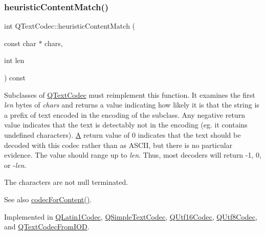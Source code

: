 \subsubsection{\texorpdfstring{heuristicContentMatch()}{heuristicContentMatch()}}
{\footnotesize\ttfamily int Q\+Text\+Codec\+::heuristic\+Content\+Match (\begin{DoxyParamCaption}\item[{const char $\ast$}]{chars,  }\item[{int}]{len }\end{DoxyParamCaption}) const\hspace{0.3cm}{\ttfamily [pure virtual]}}

Subclasses of \mbox{\hyperlink{class_q_text_codec}{Q\+Text\+Codec}} must reimplement this function. It examines the first {\itshape len} bytes of {\itshape chars} and returns a value indicating how likely it is that the string is a prefix of text encoded in the encoding of the subclass. Any negative return value indicates that the text is detectably not in the encoding (eg. it contains undefined characters). \mbox{\hyperlink{class_a}{A}} return value of 0 indicates that the text should be decoded with this codec rather than as A\+S\+C\+II, but there is no particular evidence. The value should range up to {\itshape len}. Thus, most decoders will return -\/1, 0, or -\/{\itshape len}.

The characters are not null terminated.

\begin{DoxySeeAlso}{See also}
\mbox{\hyperlink{class_q_text_codec_aeb3ec365c6c4f1812689a2b66ed09e27}{codec\+For\+Content()}}. 
\end{DoxySeeAlso}


Implemented in \mbox{\hyperlink{class_q_latin1_codec_a6d2af26fea72aee95f3f07049deeb72c}{Q\+Latin1\+Codec}}, \mbox{\hyperlink{class_q_simple_text_codec_a77599a0baeceb12a42dadcbeb9b03994}{Q\+Simple\+Text\+Codec}}, \mbox{\hyperlink{class_q_utf16_codec_af33db3e4543fbeb677fd51366d237e2f}{Q\+Utf16\+Codec}}, \mbox{\hyperlink{class_q_utf8_codec_a30b73712b3cb1d243986eb406a3b7b5b}{Q\+Utf8\+Codec}}, and \mbox{\hyperlink{class_q_text_codec_from_i_o_d_a5a3016db9b6c0f2ad76bbf74ce60a053}{Q\+Text\+Codec\+From\+I\+OD}}.

\mbox{\label{class_q_text_codec_a1bcf2f11fac6113fd6ae74dda55b2ca4}} 
